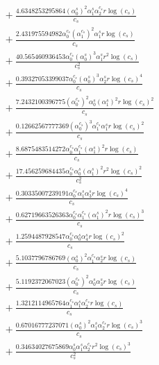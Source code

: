 \documentclass[10pt]{article}
\begin{document}
\begin{align*}
&{}  + \frac{4.6348253295864 \left(\alpha_{0}^s\right)^{2} \alpha_{1}^s \alpha_{2}^{c_s} r \log{\left(c_{s} \right)}}{c_{s}} \\
&{}  + \frac{2.431975594982 \alpha_{0}^{c_s} \left(\alpha_{1}^{c_s}\right)^{2} \alpha_{1}^s r \log{\left(c_{s} \right)}}{c_{s}} \\
&{}  + \frac{40.565460936453 \alpha_{0}^{c_s} \left(\alpha_{0}^s\right)^{3} \alpha_{1}^s r^{2} \log{\left(c_{s} \right)}}{c_{s}^{2}} \\
&{}  + \frac{0.39327053399037 \alpha_{0}^{c_s} \left(\alpha_{0}^s\right)^{3} \alpha_{2}^s r \log{\left(c_{s} \right)}^{4}}{c_{s}} \\
&{}  + \frac{7.2432100396775 \left(\alpha_{0}^{c_s}\right)^{2} \alpha_{0}^s \left(\alpha_{1}^s\right)^{2} r \log{\left(c_{s} \right)}^{2}}{c_{s}} \\
&{}  + \frac{0.12662567777369 \left(\alpha_{0}^{c_s}\right)^{3} \alpha_{1}^{c_s} \alpha_{1}^s r \log{\left(c_{s} \right)}^{2}}{c_{s}} \\
&{}  + \frac{8.6875483514272 \alpha_{0}^{c_s} \alpha_{1}^{c_s} \left(\alpha_{1}^s\right)^{2} r \log{\left(c_{s} \right)}}{c_{s}} \\
&{}  + \frac{17.456259684435 \alpha_{0}^{c_s} \alpha_{0}^s \left(\alpha_{1}^s\right)^{2} r^{2} \log{\left(c_{s} \right)}^{2}}{c_{s}^{2}} \\
&{}  + \frac{0.30335007239191 \alpha_{0}^{c_s} \alpha_{1}^s \alpha_{3}^s r \log{\left(c_{s} \right)}^{4}}{c_{s}} \\
&{}  + \frac{0.62719663526363 \alpha_{0}^{c_s} \alpha_{1}^{c_s} \left(\alpha_{1}^s\right)^{2} r \log{\left(c_{s} \right)}^{3}}{c_{s}} \\
&{}  + \frac{1.2594487928547 \alpha_{0}^{c_s} \alpha_{0}^s \alpha_{4}^s r \log{\left(c_{s} \right)}^{2}}{c_{s}} \\
&{}  + \frac{5.1037796786769 \left(\alpha_{0}^s\right)^{2} \alpha_{1}^{c_s} \alpha_{2}^s r \log{\left(c_{s} \right)}}{c_{s}} \\
&{}  + \frac{5.1192372067023 \left(\alpha_{0}^{c_s}\right)^{2} \alpha_{0}^s \alpha_{3}^s r \log{\left(c_{s} \right)}}{c_{s}} \\
&{}  + \frac{1.3212114965764 \alpha_{1}^{c_s} \alpha_{1}^s \alpha_{2}^{c_s} r \log{\left(c_{s} \right)}}{c_{s}} \\
&{}  + \frac{0.67016777237071 \left(\alpha_{0}^s\right)^{2} \alpha_{1}^s \alpha_{2}^{c_s} r \log{\left(c_{s} \right)}^{3}}{c_{s}} \\
&{}  + \frac{0.34634027675869 \alpha_{0}^s \alpha_{1}^s \alpha_{2}^{c_s} r^{2} \log{\left(c_{s} \right)}^{3}}{c_{s}^{2}} \\

\end{align*}
\end{document}

